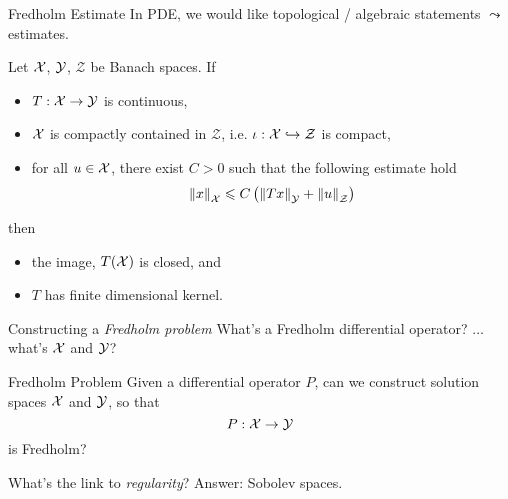 \documentclass{beamer}
\begin{document}
\begin{frame}{Fredholm Estimate}
In PDE, we would like  topological / algebraic statements $\leadsto$ estimates. 
\pause
\begin{theorem} \label{theorem: fredholm estimates}
    Let $\X$, $\Y$, $\mathcal{Z}$ be Banach spaces.  If 
    \begin{itemize}
        \item $T : \X \to \Y$ is continuous, 
        \item $\X$ is compactly contained in $\mathcal{Z}$, i.e.  $\iota : \X\hookrightarrow \mathcal{Z}$ is compact, 
        \item for all $u \in \X$, there exist $C > 0$ such that the  following estimate hold
        \begin{align}
        \norm[x]_\X \leq C \brac{\norm[Tx]_\Y + \norm[u]_\mathcal{Z}}
        \end{align}
    \end{itemize}
    then 
    \begin{itemize}
        \item the image, $T(\X)$ is closed, and
        \item $T$ has finite dimensional kernel. 
    \end{itemize} 
\end{theorem}


\end{frame} 

\begin{frame}{Constructing a \textit{Fredholm problem}} 
What's a Fredholm differential operator? $\dots $ what's $\X$ and $\Y$? 
\begin{block}{Fredholm Problem}
    Given a differential operator $P$, can we construct solution spaces $\X$ and $ \Y$,  so that $$P : \X \to \Y$$ is Fredholm? 
\end{block}
\pause 

What's the link to \textit{regularity}? Answer: Sobolev spaces. 

\end{frame} 
\end{document}
